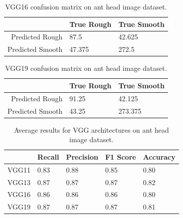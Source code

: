 \documentclass{aci}
\numberwithin{equation}{section}
\begin{document}
\vspace{0.5in}

\begin{table}[h]
    \centering
    \caption{VGG16 confusion matrix on ant head image dataset.}
    \begin{tabular}{r|ll}
                         & True Rough & True Smooth \\
        \hline
        Predicted Rough  & 87.5       & 42.625      \\
        Predicted Smooth & 47.375     & 272.5       \\
    \end{tabular}
    \label{tab:vgg16_confusion_matrix}
\end{table}

\vspace{0.5in}

\begin{table}[h]
    \centering
    \caption{VGG19 confusion matrix on ant head image dataset.}
    \begin{tabular}{r|ll}
                         & True Rough & True Smooth \\
        \hline
        Predicted Rough  & 91.25      & 42.125      \\
        Predicted Smooth & 43.25      & 273.375     \\
    \end{tabular}
    \label{tab:vgg19_confusion_matrix}
\end{table}

\vspace{0.5in}

\begin{table}[h]
    \centering
    \caption{Average results for VGG architectures on ant head image dataset.}
    \begin{tabular}{r|llll}
              & Recall & Precision & F1 Score & Accuracy \\
        \hline
        VGG11 & 0.83   & 0.88      & 0.85     & 0.80     \\
        VGG13 & 0.87   & 0.87      & 0.87     & 0.82     \\
        VGG16 & 0.86   & 0.86      & 0.86     & 0.80     \\
        VGG19 & 0.87   & 0.87      & 0.87     & 0.81     \\
    \end{tabular}
    \label{tab:vgg_results}
\end{table}
\end{document}
